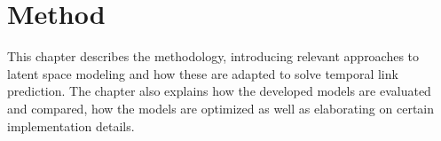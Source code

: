 \chapter{Method}\label{ch:Method}

This chapter describes the methodology, introducing relevant approaches to latent space modeling and how these are adapted to solve temporal link prediction. 
The chapter also explains how the developed models are evaluated and compared, how the models are optimized as well as elaborating on certain implementation details.









